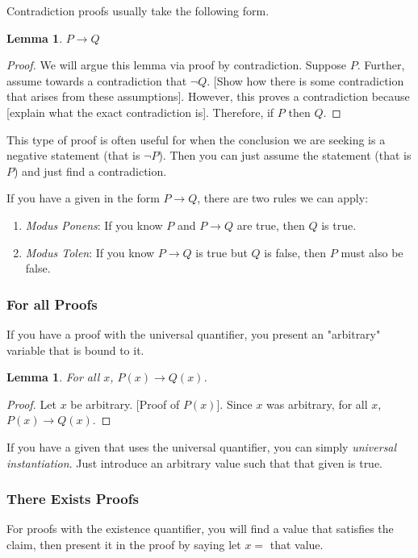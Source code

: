 \documentclass{article}
\newtheorem{lemma}[theorem]{Lemma}
\begin{document}
\noindent Contradiction proofs usually take the following form.
\begin{lemma}
    $P \rightarrow Q$
\end{lemma}
\begin{proof}
    We will argue this lemma via proof by contradiction. Suppose $P$. Further, assume towards a contradiction that $\neg Q$. [Show how there
    is some contradiction that arises from these assumptions]. However, this proves a contradiction because [explain what the exact 
    contradiction is]. Therefore, if $P$ then $Q$.
\end{proof}

\noindent This type of proof is often useful for when the conclusion we are seeking is a negative statement (that is $\neg P$). Then you can just assume
the statement (that is $P$) and just find a contradiction.

If you have a given in the form $P \rightarrow Q$, there are two rules we can apply:
    \begin{enumerate}
        \item \textit{Modus Ponens}: If you know $P$ and $P \rightarrow Q$ are true, then $Q$ is true.
        \item \textit{Modus Tolen}: If you know $P \rightarrow Q$ is true but $Q$ is false, then $P$ must also be false.
    \end{enumerate}

\subsubsection{For all Proofs}
If you have a proof with the universal quantifier, you present an "arbitrary" variable that is bound to it.

\begin{lemma}
    For all $x$, $P(x) \rightarrow Q(x)$.
\end{lemma}
\begin{proof}
    Let $x$ be arbitrary. [Proof of $P(x)$]. Since $x$ was arbitrary, for all $x$, $P(x) \rightarrow Q(x)$.
\end{proof}

\noindent If you have a given that uses the universal quantifier, you can simply \textit{universal instantiation}. Just introduce an arbitrary
value such that that given is true.

\subsubsection{There Exists Proofs}
For proofs with the existence quantifier, you will find a value that satisfies the claim, then present it in the proof by saying let $x = $ that value.
\end{document}
